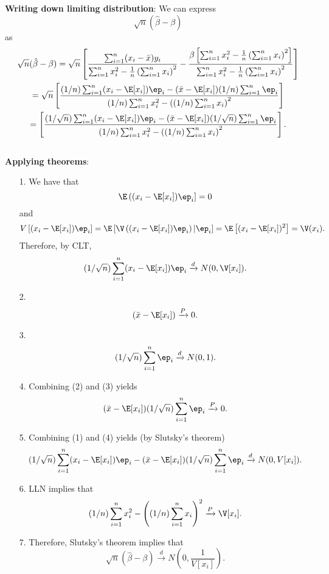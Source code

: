 \documentclass[12pt]{article}
\begin{document}
\noindent
\textbf{Writing down limiting distribution}:
We can express $$\sqrt{n}(\hat{\beta} - \beta)$$ as
\begin{multline*}
\sqrt{n}(\hat{\beta} - \beta) = \sqrt{n} \left[ \frac{\sum_{i=1}^n (x_i - \bar{x}) y_i }{ \sum_{i=1}^n x_i^2 - \frac{1}{n}\left(\sum_{i=1}^n x_i \right)^2} -\frac{ \beta  \left[\sum_{i=1}^n x_i^2 - \frac{1}{n}\left(\sum_{i=1}^n x_i \right)^2 \right]}{\sum_{i=1}^n x_i^2 - \frac{1}{n}\left( \sum_{i=1}^n x_i \right)^2} \right] \\ = \sqrt{n} \left[\frac{(1/n)\sum_{i=1}^n (x_i - \E[x_i])\ep_i - (\bar{x} - \E[x_i]) (1/n) \sum_{i=1}^{n} \ep_i}{(1/n) \sum_{i=1}^n x_i^2 - \left((1/n) \sum_{i=1}^n x_i \right)^2} \right] \\ =  \left[ \frac{ (1/\sqrt{n})\sum_{i=1}^n (x_i - \E[x_i])\ep_i - (\bar{x} - \E[x_i]) (1/\sqrt{n}) \sum_{i=1}^{n} \ep_i }{ (1/n) \sum_{i=1}^n x_i^2 - \left((1/n) \sum_{i=1}^n x_i \right)^2 } \right].
\end{multline*}
\\ \noindent
\textbf{Applying theorems}:

\begin{itemize}
\item[1.] We have that $$\E\left( (x_i - \E[x_i]) \ep_i\right] = 0$$ and $$ V\left[( x_i - \E[x_i]) \ep_i \right] = \E \left[ \V \left(( x_i - \E[x_i] )\ep_i\right) | \ep_i \right] = \E \left[ (x_i - \E[x_i])^2 \right] = \V(x_i).$$ Therefore, by CLT,
$$ (1/\sqrt{n}) \sum_{i=1}^n (x_i - \E[x_i]) \ep_i \xrightarrow{d} N(0, \V[x_i]).$$
\item[2.] $$( \bar{x} - \E[x_i]) \xrightarrow{P} 0.$$
\item[3.] $$ (1/\sqrt{n}) \sum_{i=1}^n \ep_i \xrightarrow{d} N(0,1).$$
\item[4.] Combining (2) and (3) yields
$$ (\bar{x} - \E[x_i]) (1/\sqrt{n}) \sum_{i=1}^n \ep_i \xrightarrow{P} 0.$$
\item[5.] Combining (1) and (4) yields (by Slutsky's theorem)
$$ (1/\sqrt{n})\sum_{i=1}^n (x_i - \E[x_i])\ep_i - (\bar{x} - \E[x_i]) (1/\sqrt{n}) \sum_{i=1}^{n} \ep_i \xrightarrow{d} N( 0, V[x_i]).$$
\item[6.] LLN implies that
$$ (1/n) \sum_{i=1}^n x_i^2 - \left((1/n) \sum_{i=1}^n x_i \right)^2 \xrightarrow{P} \V[x_i].$$
\item[7.] Therefore, Slutsky's theorem implies that
$$\sqrt{n} \left( \hat{\beta} - \beta \right) \xrightarrow{d} N \left(0, \frac{1}{V[x_i]}\right).$$
\end{itemize}
\end{document}
